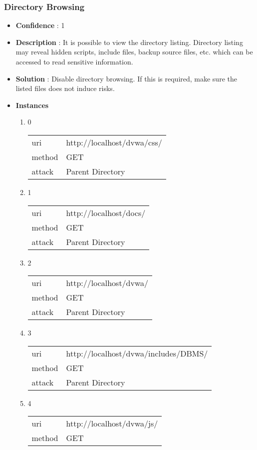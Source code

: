 \documentclass[10pt]{article}
\begin{document}
\subsubsection{Directory Browsing}
\begin{itemize}
\item[] \textbf{Confidence} : 1
\item[] \textbf{Description} : It is possible to view the directory listing.  Directory listing may reveal hidden scripts, include files, backup source files, etc. which can be accessed to read sensitive information.
\item[] \textbf{Solution} :  Disable directory browsing.  If this is required, make sure the listed files does not induce risks.
\item[] \textbf{Instances}
\begin{enumerate}
\item[] 0
\begin{tabular}{| l | p{14cm}}
uri & http://localhost/dvwa/css/ \\
method & GET \\
attack & Parent Directory \\
\end{tabular}
\item[] 1
\begin{tabular}{| l | p{14cm}}
uri & http://localhost/docs/ \\
method & GET \\
attack & Parent Directory \\
\end{tabular}
\item[] 2
\begin{tabular}{| l | p{14cm}}
uri & http://localhost/dvwa/ \\
method & GET \\
attack & Parent Directory \\
\end{tabular}
\item[] 3
\begin{tabular}{| l | p{14cm}}
uri & http://localhost/dvwa/includes/DBMS/ \\
method & GET \\
attack & Parent Directory \\
\end{tabular}
\item[] 4
\begin{tabular}{| l | p{14cm}}
uri & http://localhost/dvwa/js/ \\
method & GET \\

\end{tabular}
\end{enumerate}
\end{itemize}
\end{document}
